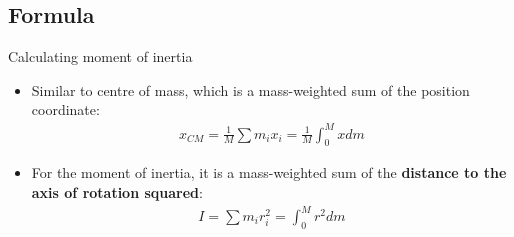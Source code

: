 \documentclass[aspectratio=169,
hyperref={colorlinks,urlcolor=blue}
]{beamer}
\begin{document}
\subsection{Formula}
\label{subsec:iformula}
\begin{frame}{Calculating moment of inertia}
\begin{itemize}
\item Similar to centre of mass, which is a mass-weighted sum of the position coordinate:
\begin{align*}
x_{CM}=\frac{1}{M}\sum m_ix_i=\frac{1}{M}\int_0^M xdm
\end{align*}
\item For the moment of inertia, it is a mass-weighted sum of the \textbf{distance to the axis of rotation squared}:
\begin{align*}
I=\sum m_ir_i^2  =\int_0^M r^2 dm
\end{align*}
\end{itemize}
\end{frame}


\end{document}
